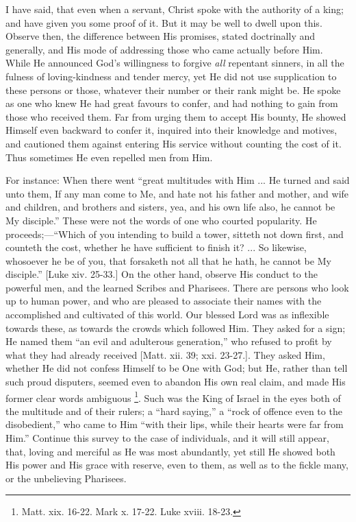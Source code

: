 I have said, that even when a servant, Christ spoke
with the authority of a king; and have given you some
proof of it. But it may be well to dwell upon this.
Observe then, the difference between His promises, stated
doctrinally and generally, and His mode of addressing
those who came actually before Him. While He announced
God's willingness to forgive \emph{all} repentant
sinners, in all the fulness of loving-kindness and tender
mercy, yet He did not use supplication to these persons
or those, whatever their number or their rank might be. He spoke as one who knew He had great favours to confer,
and had nothing to gain from those who received them. Far
from urging them to accept His bounty, He showed Himself
even backward to confer it, inquired into their knowledge
and motives, and cautioned them against entering His
service without counting the cost of it. Thus sometimes
He even repelled men from Him.

For instance: When there went ``great multitudes
with Him ... He turned and said unto them, If any man
come to Me, and hate not his father and mother, and wife
and children, and brothers and sisters, yea, and his own
life also, he cannot be My disciple.'' These were not
the words of one who courted popularity. He
proceeds;—``Which of you intending to build a
tower, sitteth not down first, and counteth the cost,
whether he have sufficient to finish it? ... So likewise,
whosoever he be of you, that forsaketh not all that he
hath, he cannot be My disciple.'' [Luke xiv. 25-33.]
On the other hand, observe His conduct to the powerful
men, and the learned Scribes and Pharisees. There are
persons who look up to human power, and who are pleased
to associate their names with the accomplished and
cultivated of this world. Our blessed Lord was as
inflexible towards these, as towards the crowds which
followed Him. They asked for a sign; He named them
``an evil and adulterous generation,'' who
refused to profit by what they had already received
[Matt. xii. 39; xxi. 23-27.]. They asked Him, whether He
did not confess Himself to be One with God; but He,
rather than tell such proud disputers, seemed even to
abandon His own real claim, and made His former clear
words ambiguous \footnote{Matt. xix. 16-22. Mark x. 17-22. Luke
xviii. 18-23.}. Such was the King of
Israel in the eyes both of the multitude and of their
rulers; a ``hard saying,'' a ``rock of
offence even to the disobedient,'' who came to Him
``with their lips, while their hearts were far from
Him.'' Continue this survey to the case of
individuals, and it will still appear, that, loving and
merciful as He was most abundantly, yet still He showed
both His power and His grace with reserve, even to them,
as well as to the fickle many, or the unbelieving
Pharisees.

